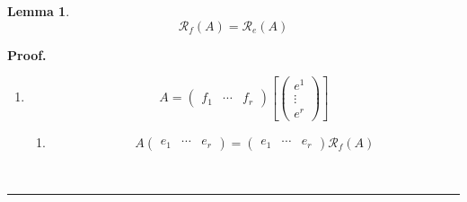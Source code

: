 \documentclass[aps,preprint]{revtex4}
\newtheorem{lemma}[theorem]{Lemma}
\newenvironment{proof}[1][Proof]{\noindent\textbf{#1.} }{\ \rule{0.5em}{0.5em}}
\begin{document}
\begin{lemma}
\begin{equation}
\mathcal{R}_{f}\left( A\right) =\mathcal{R}_{e}\left( A\right)
\end{equation}
\end{lemma}

\begin{proof}
\begin{enumerate}
\item 
\begin{equation}
A=\left( 
\begin{array}{ccc}
f_{1} & \cdots & f_{r}%
\end{array}%
\right) \left[ \left( 
\begin{array}{c}
e^{1} \\ 
\vdots \\ 
e^{r}%
\end{array}%
\right) \right]
\end{equation}

\begin{enumerate}
\item 
\begin{equation}
A\left( 
\begin{array}{ccc}
e_{1} & \cdots & e_{r}%
\end{array}%
\right) =\left( 
\begin{array}{ccc}
e_{1} & \cdots & e_{r}%
\end{array}%
\right) \mathcal{R}_{f}\left( A\right)
\end{equation}


\end{enumerate}
\end{enumerate}
\end{proof}
\end{document}

